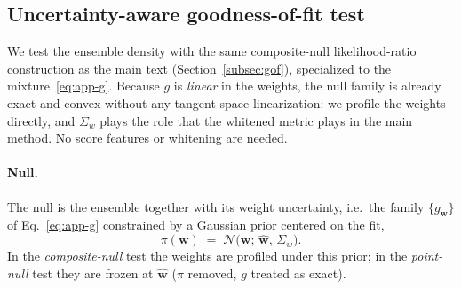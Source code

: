 \subsection{Uncertainty-aware goodness-of-fit test}
\label{app:nf-gof}
We test the ensemble density with the same composite-null likelihood-ratio
construction as the main text (Section~\ref{subsec:gof}), specialized to the
mixture~\eqref{eq:app-g}. Because $g$ is \emph{linear} in the weights, the null
family is already exact and convex without any tangent-space linearization: we
profile the weights directly, and $\Sigma_w$ plays the role that the whitened
metric plays in the main method. No score features or whitening are needed.

\paragraph{Null.}
The null is the ensemble together with its weight uncertainty, i.e.\ the family
$\{g_{\boldsymbol w}\}$ of Eq.~\eqref{eq:app-g} constrained by a Gaussian prior
centered on the fit,
\begin{equation}\label{eq:app-prior}
  \pi(\boldsymbol w) \;=\; \mathcal N\!\big(\boldsymbol w;\, \hat{\boldsymbol w},\,\Sigma_w\big).
\end{equation}
In the \emph{composite-null} test the weights are profiled under this prior; in
the \emph{point-null} test they are frozen at $\hat{\boldsymbol w}$ ($\pi$ removed,
$g$ treated as exact).

